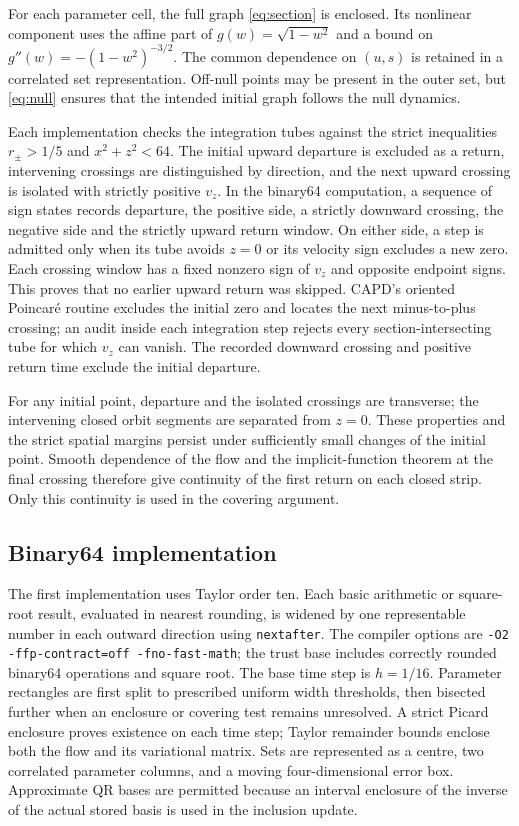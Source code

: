 For each parameter cell, the full graph \eqref{eq:section} is enclosed. Its
nonlinear component uses the affine part of $g(w)=\sqrt{1-w^2}$ and a bound on
$g''(w)=-(1-w^2)^{-3/2}$. The common dependence on $(u,s)$ is retained in a
correlated set representation. Off-null points may be present in the outer
set, but \eqref{eq:null} ensures that the intended initial graph follows the
null dynamics.

Each implementation checks the integration tubes against the strict
inequalities $r_\pm>1/5$ and $x^2+z^2<64$. The initial upward departure is
excluded as a return, intervening crossings are distinguished by direction,
and the next upward crossing is isolated with strictly positive $v_z$.
In the binary64 computation, a sequence of sign states records departure,
the positive side, a strictly downward crossing, the negative side and the
strictly upward return window. On either side, a step is admitted only when
its tube avoids $z=0$ or its velocity sign excludes a new zero. Each crossing
window has a fixed nonzero sign of $v_z$ and opposite endpoint signs. This
proves that no earlier upward return was skipped. CAPD's oriented
Poincar\'e routine excludes the initial zero and locates the next
minus-to-plus crossing; an audit inside each integration step rejects every
section-intersecting tube for which $v_z$ can vanish. The recorded downward
crossing and positive return time exclude the initial departure.

For any initial point, departure and the isolated crossings are transverse;
the intervening closed orbit segments are separated from $z=0$. These
properties and the strict spatial margins persist under sufficiently small
changes of the initial point. Smooth dependence of the flow and the
implicit-function theorem at the final crossing therefore give continuity
of the first return on each closed strip. Only this continuity is used in
the covering argument.

\subsection{Binary64 implementation}

The first implementation uses Taylor order ten. Each basic arithmetic or
square-root result, evaluated in nearest rounding, is widened by one
representable number in each outward direction using \texttt{nextafter}.
The compiler options are \texttt{-O2 -ffp-contract=off -fno-fast-math};
the trust base includes correctly rounded binary64 operations and square
root. The base time step is $h=1/16$. Parameter rectangles are first split
to prescribed uniform width thresholds, then bisected further when an
enclosure or covering test remains unresolved. A strict Picard enclosure
proves existence on each time
step; Taylor remainder bounds enclose both the flow and its variational
matrix. Sets are represented as a centre, two correlated parameter columns,
and a moving four-dimensional error box. Approximate QR bases are permitted
because an interval enclosure of the inverse of the actual stored basis is
used in the inclusion update.

